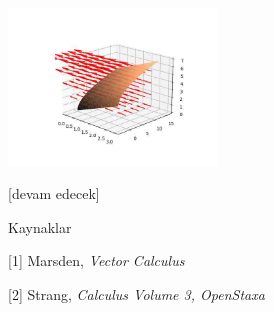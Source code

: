 \documentclass[12pt,fleqn]{article}\usepackage{../../common}
\begin{document}
\includegraphics[width=15em]{calc_multi_75_app_03.jpg}





[devam edecek]

Kaynaklar

[1] Marsden, {\em Vector Calculus}

[2] Strang, {\em Calculus Volume 3, OpenStaxa}
\end{document}
